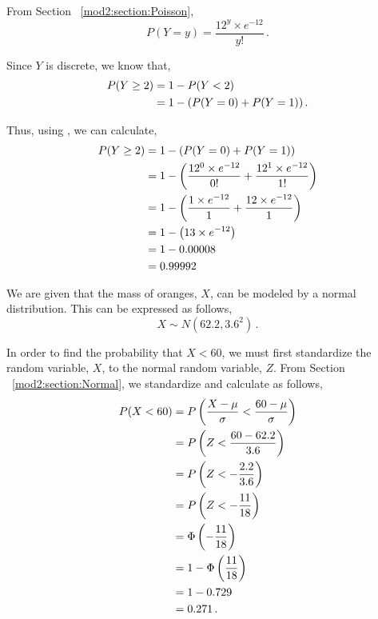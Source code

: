 \begin{subquestions}
\begin{subsubquestions}
From Section ~\ref{mod2:section:Poisson},
\begin{equation}
	P(Y=y) = \frac{12^{y} \times e^{-12}}{y!} \,. \label{2014:q4:PoisEqn2}
\end{equation}

Since $Y$ is discrete, we know that,
\begin{align}
	P(Y \geq 2) & = 1 - P(Y<2) \nonumber \\
	            & = 1 - (P(Y=0) + P(Y=1)) \,.
\end{align}

Thus, using , we can calculate,
\begin{align}
	P(Y \geq 2) & = 1 - (P(Y=0) + P(Y=1)) \nonumber \\
	            & = 1 - \left(\frac{12^{0} \times e^{-12}}{0!} + \frac{12^{1} \times e^{-12}}{1!} \right) \nonumber \\
	            & = 1 - \left(\frac{1 \times e^{-12}}{1} + \frac{12 \times e^{-12}}{1} \right) \nonumber \\
	            & = 1 - \left(13 \times e^{-12} \right) \nonumber \\
	            & = 1 - 0.00008 \nonumber \\
	            & = 0.99992
\end{align}

\end{subsubquestions}

	
\subquestion

We are given that the mass of oranges, $X$, can be modeled by a normal distribution. This can be expressed as follows,
\begin{equation}
	X \sim N(62.2, 3.6^2) \,.
\end{equation}

\begin{subsubquestions}
	
\subsubquestion

In order to find the probability that $X<60$, we must first standardize the random variable, $X$, to the normal random variable, $Z$. From Section ~\ref{mod2:section:Normal}, we standardize and calculate as follows,
\begin{align}
	P (X<60) & = P\left(\frac{X - \mu}{\sigma} < \frac{60 - \mu}{\sigma} \right) \nonumber \\
	         & = P\left(Z < \frac{60-62.2}{3.6} \right) \nonumber \\
	         & = P\left(Z < -\frac{2.2}{3.6} \right) \nonumber \\	
	         & = P\left(Z < -\frac{11}{18} \right) \nonumber \\
	         & = \Phi\left(-\frac{11}{18} \right) \nonumber \\
	         & = 1 - \Phi\left(\frac{11}{18} \right) \nonumber \\
	         & = 1 - 0.729 \nonumber \\
	         & = 0.271 \,.	
\end{align}
	

\end{subsubquestions}
\end{subquestions}
